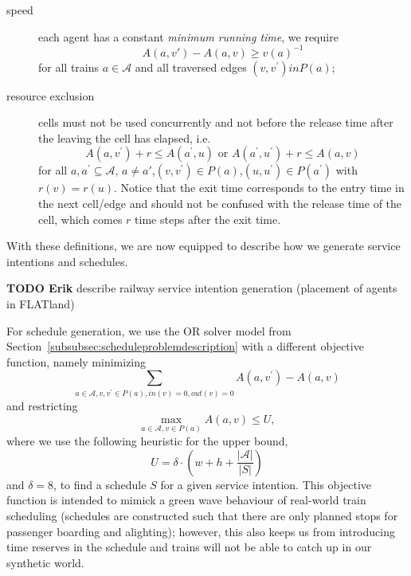 \documentclass{article}
\begin{document}
\begin{description}
\item[speed] each agent has a constant \emph{minimum running time}, we require
\begin{equation}
    A(a,v')-A(a,v)\geq {v(a)}^{-1}
\end{equation} for all trains $a\in \mathcal{A}$ and all traversed edges $(v,v^\prime) in P(a)$;
\item[resource exclusion] cells must not be used concurrently and not before the release time after the leaving the cell has elapsed, i.e.
\begin{equation}
A(a, v^\prime) +r \leq A(a^\prime, u) \textrm{ or }A(a^\prime, u^\prime) + r\leq A(a, v) \label{eq:resource_exclusion}
\end{equation}
for all ${a, a^\prime} \subseteq \mathcal{A}$, $a\not=a'$,$(v, v^\prime)\in P(a)$,$(u, u^\prime)\in P(a^\prime)$ with $r(v)=r(u)$.
%
Notice that the exit time corresponds to the entry time in the next cell/edge and should not be confused with the release time of the cell, which comes $r$ time steps after the exit time.
\end{description}


With these definitions, we are now equipped to describe how we generate service intentions and schedules.

\begin{mdframed}
{\bf TODO Erik} describe railway service intention generation (placement of agents in FLATland)
\end{mdframed}

For schedule generation, we use the OR solver model from Section~\ref{subsubsec:scheduleproblemdescription} with a different objective function, namely minimizing
\begin{equation}
\sum_{a \in \mathcal{A}, v,v^\prime \in P(a), in(v)=0, out(v)=0} A(a,v^\prime) - A(a,v)
\end{equation}
and restricting
\begin{equation}
\max_{a \in \mathcal{A}, v \in P(a)} A(a,v) \leq U,
\end{equation}
where we use the following heuristic for the upper bound,
\begin{equation}
U=\delta \cdot  \left(w + h + \frac{\left|\mathcal{A}\right|}{\left| S \right|} \right)
\end{equation}
and $\delta=8$,
to find a schedule $S$ for a given service intention. This objective function is intended to mimick a green wave behaviour of real-world train scheduling (schedules are constructed such that there are only planned stops for passenger boarding and alighting); however, this also keeps us from introducing time reserves in the schedule and trains will not be able to catch up in our synthetic world.
\end{document}
